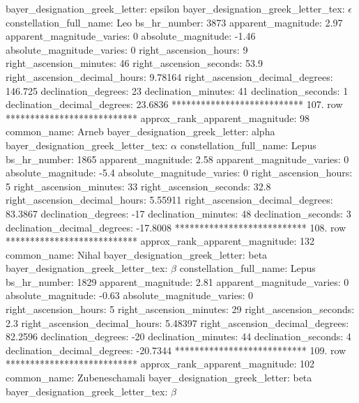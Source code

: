     bayer_designation_greek_letter: epsilon
bayer_designation_greek_letter_tex: $\epsilon$
           constellation_full_name: Leo
                      bs_hr_number: 3873
                apparent_magnitude: 2.97
         apparent_magnitude_varies: 0
                absolute_magnitude: -1.46
         absolute_magnitude_varies: 0
             right_ascension_hours: 9
           right_ascension_minutes: 46
           right_ascension_seconds: 53.9
     right_ascension_decimal_hours: 9.78164
   right_ascension_decimal_degrees: 146.725
               declination_degrees: 23
               declination_minutes: 41
               declination_seconds: 1
       declination_decimal_degrees: 23.6836
*************************** 107. row ***************************
    approx_rank_apparent_magnitude: 98
                       common_name: Arneb
    bayer_designation_greek_letter: alpha
bayer_designation_greek_letter_tex: $\alpha$
           constellation_full_name: Lepus
                      bs_hr_number: 1865
                apparent_magnitude: 2.58
         apparent_magnitude_varies: 0
                absolute_magnitude: -5.4
         absolute_magnitude_varies: 0
             right_ascension_hours: 5
           right_ascension_minutes: 33
           right_ascension_seconds: 32.8
     right_ascension_decimal_hours: 5.55911
   right_ascension_decimal_degrees: 83.3867
               declination_degrees: -17
               declination_minutes: 48
               declination_seconds: 3
       declination_decimal_degrees: -17.8008
*************************** 108. row ***************************
    approx_rank_apparent_magnitude: 132
                       common_name: Nihal
    bayer_designation_greek_letter: beta
bayer_designation_greek_letter_tex: $\beta$
           constellation_full_name: Lepus
                      bs_hr_number: 1829
                apparent_magnitude: 2.81
         apparent_magnitude_varies: 0
                absolute_magnitude: -0.63
         absolute_magnitude_varies: 0
             right_ascension_hours: 5
           right_ascension_minutes: 29
           right_ascension_seconds: 2.3
     right_ascension_decimal_hours: 5.48397
   right_ascension_decimal_degrees: 82.2596
               declination_degrees: -20
               declination_minutes: 44
               declination_seconds: 4
       declination_decimal_degrees: -20.7344
*************************** 109. row ***************************
    approx_rank_apparent_magnitude: 102
                       common_name: Zubeneschamali
    bayer_designation_greek_letter: beta
bayer_designation_greek_letter_tex: $\beta$
